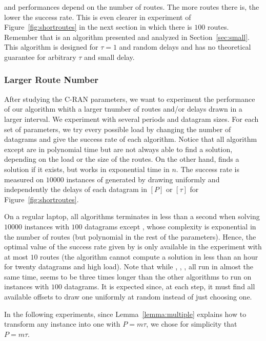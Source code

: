      \greedyuniform and \metaoffset performances depend on the number of routes. The more routes there is, the lower the success rate. This is even clearer in experiment of Figure~\ref{fig:shortroutes} in the next section in which there is $100$ routes. Remember that \greedyuniform is an algorithm presented and analyzed in Section~\ref{sec:small}. This algorithm is designed for $\tau = 1$ and random delays and has no theoretical guarantee for arbitrary $\tau$ and small delay.
     



\subsubsection{Larger Route Number}\label{sec:pazlmanyroutes} 

After studying the C-RAN parameters, we want to experiment the performance of our algorithm whith a larger tnumber of routes and/or delays drawn in a larger interval.
We experiment with several periods and datagram sizes. For each set of parameters, we try every possible load by changing the number of datagrams and give the success rate of each algorithm. Notice that all algorithm except \ESCA are in polynomial time but are not always able to find a solution, depending on the load or the size of the routes. On the other hand, \ESCA finds a solution if it exists, but works in exponential time in $n$.
 The success rate is measured on $10000$ instances of \pma generated by drawing uniformly and independently the delays of each datagram in $[P]$ or $[\tau]$ for Figure~\ref{fig:shortroutes}. 


On a regular laptop, all algorithms terminates in less than a second when solving $10000$ instances with $100$ datagrams except \ESCA, whose complexity is exponential in the number of routes (but polynomial in the rest of the parameters). Hence, the optimal value of the success rate given by \ESCA is only available in the experiment with at most $10$ routes (the algorithm cannot compute a solution in less than an hour for twenty datagrams and high load). 
Note that while \firstfit, \compactpair, \metaoffset, \compactfit all run in almost the same time,
\greedyuniform seems to be three times longer than the other algorithms to run on instances with $100$ datagrams. It is expected since, at each step, it must find all available offsets to draw one uniformly at random instead of just choosing one.

In the following experiments, since Lemma~\ref{lemma:multiple} explains how to transform any instance into one with  $P = m\tau$, we chose for simplicity that $P = m\tau$.

